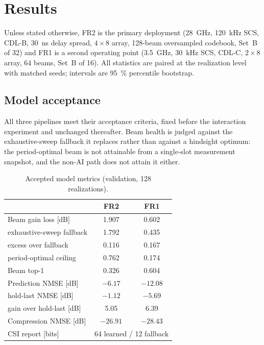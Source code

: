 \section{Results}

Unless stated otherwise, FR2 is the primary deployment
(\SI{28}{\giga\hertz}, \SI{120}{\kilo\hertz} SCS, CDL-B, \SI{30}{\nano\second}
delay spread, $4\times8$ array, 128-beam oversampled codebook, Set~B of 32)
and FR1 is a second operating point (\SI{3.5}{\giga\hertz},
\SI{30}{\kilo\hertz} SCS, CDL-C, $2\times8$ array, 64 beams, Set~B of 16).
All statistics are paired at the realization level with matched seeds;
intervals are \SI{95}{\percent} percentile bootstrap.

\subsection{Model acceptance}

All three pipelines meet their acceptance criteria, fixed before the
interaction experiment and unchanged thereafter. Beam health is judged
against the exhaustive-sweep fallback it replaces rather than against a
hindsight optimum: the period-optimal beam is not attainable from a
single-slot measurement snapshot, and the non-AI path does not attain it
either.

\begin{table}[t]
\caption{Accepted model metrics (validation, 128 realizations).}
\label{tab:acceptance}
\centering
\begin{tabular}{lcc}
\toprule
 & FR2 & FR1 \\
\midrule
Beam gain loss [dB]              & 1.907  & 0.602 \\
\quad exhaustive-sweep fallback  & 1.792  & 0.435 \\
\quad excess over fallback       & 0.116  & 0.167 \\
\quad period-optimal ceiling     & 0.762  & 0.174 \\
Beam top-1                       & 0.326  & 0.604 \\
Prediction NMSE [dB]             & $-6.17$ & $-12.08$ \\
\quad hold-last NMSE [dB]        & $-1.12$ & $-5.69$ \\
\quad gain over hold-last [dB]   & 5.05   & 6.39 \\
Compression NMSE [dB]            & $-26.91$ & $-28.43$ \\
CSI report [bits]                & \multicolumn{2}{c}{64 learned / 12 fallback} \\
\bottomrule
\end{tabular}
\end{table}

